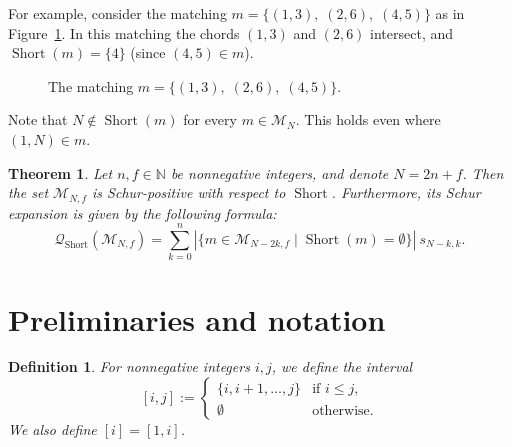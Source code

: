 \documentclass[11pt]{article}
\newtheorem{definition}[theo]{Definition}
\newtheorem{theorem}[theo]{Theorem}
\theoremstyle{definition}
\numberwithin{equation}{section}
\newcommand{\Short}{\operatorname{Short}}
\newcommand{\NN}{\mathbb{N}}
\newcommand{\Q}{\mathcal{Q}}
\newcommand{\M}{\mathcal{M}}
\begin{document}
For example, consider the matching $m = \{(1,3),\; (2,6),\; (4,5)\}$ as in Figure~\ref{fig:matching example introduction}. In this matching the chords $(1,3)$ and $(2,6)$ intersect, and $\Short(m) = \{4\}$ (since $(4,5) \in m$).
\begin{figure}[htb]
    \begin{center}
    \end{center}
    \caption{The matching $m = \{(1,3),\; (2,6),\; (4,5)\}$.}
    \label{fig:matching example introduction}
\end{figure}

Note that $N \notin \Short(m)$ for every $m \in \M_N$. This holds even where $(1,N) \in m$.

\begin{theorem}
\label{thm:matchings schur positive}
    Let $n,f \in \NN$ be nonnegative integers, and denote $N=2n+f$. Then the set $\M_{N,f}$ is Schur-positive with respect to $\Short$. Furthermore, its Schur expansion is given by the following formula:
    \[
        \Q_{\Short} (\M_{N,f}) = \sum_{k=0}^n |\{ m\in \M_{N-2k,f} \mid \Short(m) = \emptyset\}|\ s_{N-k,k}.
    \]
\end{theorem}

\section{Preliminaries and notation}
\label{sec:preliminaries}

\begin{definition}
    For nonnegative integers $i,j$, we define the \emph{interval}
    \[
        [i,j] :=
        \begin{cases}
            \{i,i+1,\dots,j\} & \text{if $i \le j$,}\\
            \emptyset & \text{otherwise.}
        \end{cases}
    \]
    We also define $[i] = [1,i]$.
\end{definition}
\end{document}

